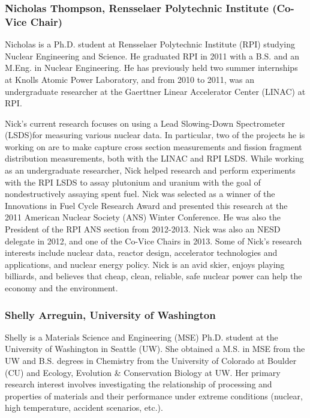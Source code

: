 \subsubsection*{Nicholas Thompson, Rensselaer Polytechnic Institute (Co-Vice Chair)}

Nicholas is a Ph.D. student at Rensselaer Polytechnic Institute (RPI) studying
Nuclear Engineering and Science. He graduated RPI in 2011 with a B.S. and an
M.Eng. in Nuclear Engineering. He has previously held two summer internships at
Knolls Atomic Power Laboratory, and from 2010 to 2011, was an undergraduate
researcher at the Gaerttner Linear Accelerator Center (LINAC) at RPI.

Nick's current research focuses on using a Lead Slowing-Down Spectrometer
(LSDS)for measuring various nuclear data. In particular, two of the projects he
is working on are to make capture cross section measurements and fission
fragment distribution measurements, both with the LINAC and RPI LSDS. While
working as an undergraduate researcher, Nick helped research and perform
experiments with the RPI LSDS to assay plutonium and uranium with the goal of
nondestructively assaying spent fuel. Nick was selected as a winner of the
Innovations in Fuel Cycle Research Award and presented this research at the 2011
American Nuclear Society (ANS) Winter Conference. He was also the President of
the RPI ANS section from 2012-2013. Nick was also an NESD delegate in 2012, and
one of the Co-Vice Chairs in 2013. Some of Nick's research interests include
nuclear data, reactor design, accelerator technologies and applications, and
nuclear energy policy. Nick is an avid skier, enjoys playing billiards, and
believes that cheap, clean, reliable, safe nuclear power can help the economy
and the environment.

\subsubsection*{Shelly Arreguin, University of Washington}

Shelly is a Materials Science and Engineering (MSE) Ph.D. student at the
University of Washington in Seattle (UW). She obtained a M.S. in MSE from the UW
and B.S. degrees in Chemistry from the University of Colorado at Boulder
(CU) and Ecology, Evolution \& Conservation Biology at UW. Her primary research
interest involves investigating the relationship of processing and properties of
materials and their performance under extreme conditions (nuclear, high
temperature, accident scenarios, etc.).

